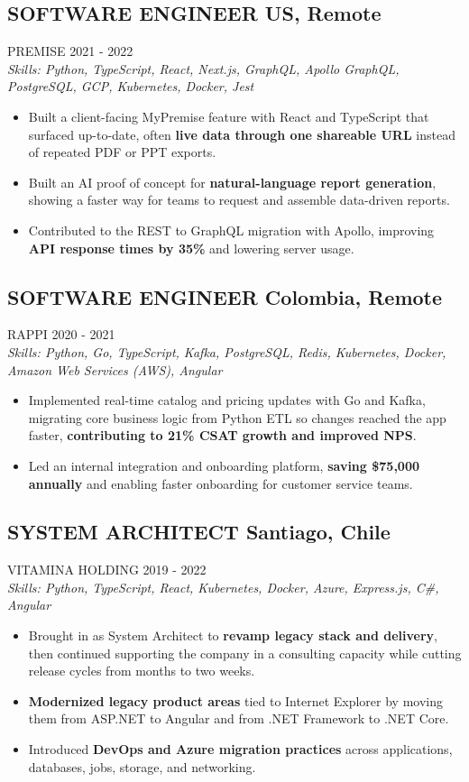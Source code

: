 \documentclass{article}
\newcommand{\WorkExperience}[2]{
   \subsection*{#1}
   \vspace{-1em}
   \uppercase{#2}
}
\newcommand{\Skills}[1]{
   \textit{Skills: #1}
}
\begin{document}
\WorkExperience{SOFTWARE ENGINEER \hfill US, Remote}{Premise \hfill 2021 {-} 2022} \\
\Skills{Python, TypeScript, React, Next.js, GraphQL, Apollo GraphQL, PostgreSQL, GCP, Kubernetes, Docker, Jest}
\begin{itemize}
	\item Built a client-facing MyPremise feature with React and TypeScript that surfaced up-to-date, often \textbf{live data through one shareable URL} instead of repeated PDF or PPT exports.
	\item Built an AI proof of concept for \textbf{natural-language report generation}, showing a faster way for teams to request and assemble data-driven reports.
	\item Contributed to the REST to GraphQL migration with Apollo, improving \textbf{API response times by 35\%} and lowering server usage.
\end{itemize}

\WorkExperience{SOFTWARE ENGINEER \hfill Colombia, Remote}{Rappi \hfill 2020 {-} 2021} \\
\Skills{Python, Go, TypeScript, Kafka, PostgreSQL, Redis, Kubernetes, Docker, Amazon Web Services (AWS), Angular}
\begin{itemize}
	\item Implemented real-time catalog and pricing updates with Go and Kafka, migrating core business logic from Python ETL so changes reached the app faster, \textbf{contributing to 21\% CSAT growth and improved NPS}.
	\item Led an internal integration and onboarding platform, \textbf{saving \$75,000 annually} and enabling faster onboarding for customer service teams.
\end{itemize}

\WorkExperience{SYSTEM ARCHITECT \hfill Santiago, Chile}{Vitamina Holding \hfill 2019 {-} 2022} \\
\Skills{Python, TypeScript, React, Kubernetes, Docker, Azure, Express.js, C\#, Angular}
\begin{itemize}
	\item Brought in as System Architect to \textbf{revamp legacy stack and delivery}, then continued supporting the company in a consulting capacity while cutting release cycles from months to two weeks.
	\item \textbf{Modernized legacy product areas} tied to Internet Explorer by moving them from ASP.NET to Angular and from .NET Framework to .NET Core.
	\item Introduced \textbf{DevOps and Azure migration practices} across applications, databases, jobs, storage, and networking.
\end{itemize}
\end{document}
